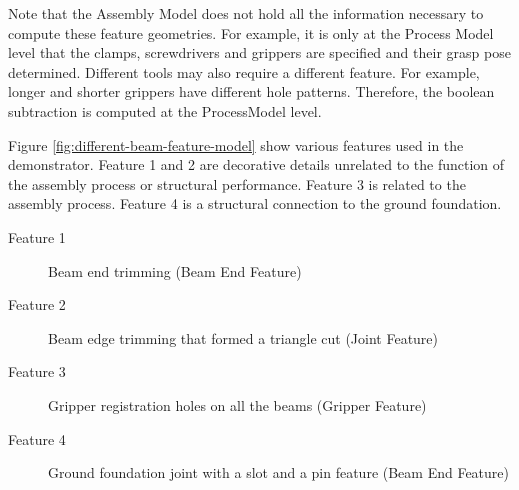 Note that the Assembly Model does not hold all the information necessary to compute these feature geometries. For example, it is only at the Process Model level that the clamps, screwdrivers and grippers are specified and their grasp pose determined. Different tools may also require a different feature. For example, longer and shorter grippers have different hole patterns. Therefore, the boolean subtraction is computed at the ProcessModel level.

Figure \ref{fig:different-beam-feature-model} show various features used in the demonstrator. Feature 1 and 2 are decorative details unrelated to the function of the assembly process or structural performance. Feature 3 is related to the assembly process. Feature 4 is a structural connection to the ground foundation.

\begin{description}
    \item[Feature 1] Beam end trimming (Beam End Feature)
    \item[Feature 2] Beam edge trimming that formed a triangle cut (Joint Feature)
    \item[Feature 3] Gripper registration holes on all the beams (Gripper Feature)
    \item[Feature 4] Ground foundation joint with a slot and a pin feature (Beam End Feature)
\end{description}

